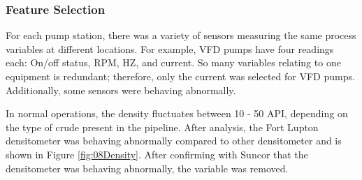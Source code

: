 \subsubsection{Feature Selection}
For each pump station, there was a variety of sensors measuring the same process variables at different locations.  For example, VFD pumps have four readings each: On/off status, RPM, HZ, and current. So many variables relating to one equipment is redundant; therefore, only the current was selected for VFD pumps. Additionally, some sensors were behaving abnormally.

In normal operations, the density fluctuates between 10 - 50 API, depending on the type of crude present in the pipeline.  After analysis, the Fort Lupton densitometer was behaving abnormally compared to other densitometer and is shown in Figure \ref{fig:08Density}.  After confirming with Suncor that the densitometer was behaving abnormally, the variable was removed.  

